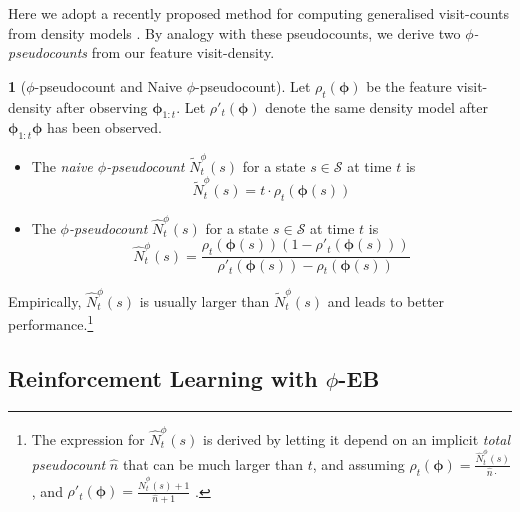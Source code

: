 \documentclass{article}
\theoremstyle{definition}
\newtheorem{defn}{\protect\definitionname}
\theoremstyle{definition}
\theoremstyle{plain}
\theoremstyle{plain}
\theoremstyle{plain}
\providecommand{\definitionname}{Definition}
\begin{document}
Here we adopt a recently proposed method for computing generalised
visit-counts from density models \cite{Bellemare2016,DBLP:journals/corr/OstrovskiBOM17}.
By analogy with these pseudocounts, we derive two \emph{$\phi$-pseudocounts}
from our feature visit-density. 
\begin{defn}
[$\phi$-pseudocount and Naive $\phi$-pseudocount]\label{def:pseudocount}
Let $\rho_{t}(\bm{\phi})$ be the feature visit-density after observing
$\bm{\phi}_{1:t}$. Let $\rho'_{t}(\bm{\phi})$ denote the same density
model after $\bm{\phi}_{1:t}\bm{\phi}$ has been observed.\end{defn}
\begin{itemize}
\item The \emph{naive $\phi$-pseudocount} \emph{$\tilde{N}_{t}^{\phi}(s)$}
for a state $s\in\mathcal{S}$ at time $t$ is
\[
\tilde{N}_{t}^{\phi}(s)=t\cdot\rho_{t}(\bm{\phi}(s))
\]

\item The \emph{$\phi$-pseudocount }$\hat{N}_{t}^{\phi}(s)$\emph{ }for
a state $s\in\mathcal{S}$ at time $t$ is 
\[
\hat{N}_{t}^{\phi}(s)=\frac{\rho_{t}(\bm{\phi}(s))(1-\rho'_{t}(\bm{\phi}(s)))}{\rho'_{t}(\bm{\phi}(s))-\rho{}_{t}(\bm{\phi}(s))}
\]

\end{itemize}
Empirically, $\hat{N}_{t}^{\phi}(s)$ is usually larger than \emph{$\tilde{N}_{t}^{\phi}(s)$}
and leads to better performance.\footnote{The expression for $\hat{N}_{t}^{\phi}(s)$ is derived by letting
it depend on an implicit \emph{total pseudocount }$\hat{n}$ that
can be much larger than $t$, and assuming $\rho_{t}(\bm{\phi})=\frac{\hat{N}_{t}^{\phi}(s)}{\hat{n}\cdot}$,
and $\rho'_{t}(\bm{\phi})=\frac{\hat{N}_{t}^{\phi}(s)+1}{\hat{n}+1}$
\cite{Bellemare2016}.} 


\subsection{Reinforcement Learning with $\phi$-EB}
\end{document}
